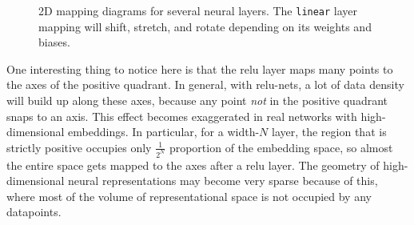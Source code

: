 \begin{figure}[h]
{\begin{minipage}{0.28\textwidth}
        \end{minipage}
    }
    \caption{2D mapping diagrams for several neural layers. The \texttt{linear} layer mapping will shift, stretch, and rotate depending on its weights and biases.}
    \label{fig:neural_nets_as_data_transformations:2D_mapping_diagrams}
\end{figure}



One interesting thing to notice here is that the relu layer maps many points to the axes of the positive quadrant. In general, with relu-nets, a lot of data density will build up along these axes, because any point \textit{not} in the positive quadrant snaps to an axis. This effect becomes exaggerated in real networks with high-dimensional embeddings. In particular, for a width-$N$ layer, the region that is strictly positive occupies only $\frac{1}{2^N}$ proportion of the embedding space, so almost the entire space gets mapped to the axes after a relu layer. The geometry of high-dimensional neural representations may become very sparse because of this, where most of the volume of representational space is not occupied by any datapoints.

